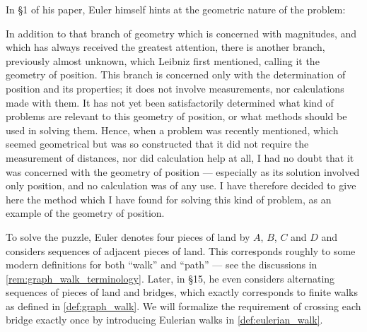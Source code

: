 \begin{example}
  In \S 1 of his paper, Euler himself hints at the geometric nature of the problem:
  \begin{displayquote}
    In addition to that branch of geometry which is concerned with magnitudes, and which has always received the greatest attention, there is another branch, previously almost unknown, which Leibniz first mentioned, calling it the geometry of position. This branch is concerned only with the determination of position and its properties; it does not involve measurements, nor calculations made with them. It has not yet been satisfactorily determined what kind of problems are relevant to this geometry of position, or what methods should be used in solving them. Hence, when a problem was recently mentioned, which seemed geometrical but was so constructed that it did not require the measurement of distances, nor did calculation help at all, I had no doubt that it was concerned with the geometry of position --- especially as its solution involved only position, and no calculation was of any use. I have therefore decided to give here the method which I have found for solving this kind of problem, as an example of the geometry of position.
  \end{displayquote}

  To solve the puzzle, Euler denotes four pieces of land by \( A \), \( B \), \( C \) and \( D \) and considers sequences of adjacent pieces of land. This corresponds roughly to some modern definitions for both \enquote{walk} and \enquote{path} --- see the discussions in \cref{rem:graph_walk_terminology}. Later, in \S 15, he even considers alternating sequences of pieces of land and bridges, which exactly corresponds to finite walks as defined in \cref{def:graph_walk}. We will formalize the requirement of crossing each bridge exactly once by introducing Eulerian walks in \cref{def:eulerian_walk}.


\end{example}
